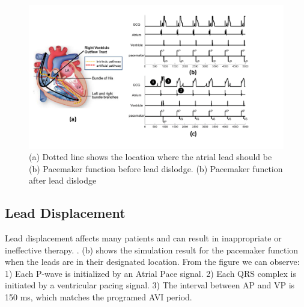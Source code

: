 \begin{figure}[t]
\centering
		\includegraphics[width=\textwidth]{figs/dislodge_all.pdf}
\caption{\small (a) Dotted line shows the location where the atrial lead should be (b) Pacemaker function before lead dislodge. (b) Pacemaker function after lead dislodge}
		\label{fig:dislodge_all}

\end{figure} 


\subsection{Lead Displacement}
Lead displacement affects many patients and can result in inappropriate or ineffective therapy. 
. (b) shows the simulation result for the pacemaker function when the leads are in their designated location. 
From the figure we can observe: 1) Each P-wave is initialized by an Atrial Pace signal. 2) Each QRS complex is initiated by a ventricular pacing signal. 3) The interval between AP and VP is 150 ms, which matches the programed AVI period.


